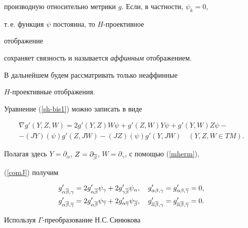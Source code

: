 производную относительно метрики $g$. Если, в частности, $\psi_k=0$,


т.\,е. функция $\psi$ постоянна, то $H$-проективное


отображение


сохраняет связность и называется {\it аффинным} отображением.


В дальнейшем будем рассматривать только неаффинные


$H$-проективные отображения.


Уравнение (\ref{sh-bis1}) можно записать в виде \cite{amka1}


\begin{multline}


\label{hp1}


\nabla g'(Y,Z,W) = 2g'(Y,Z) W\psi + g'(Z,W) Y\psi


+g'(Y,W)Z\psi - \\


- (JY)(\psi) g'(Z,JW) - (JZ)(\psi) g'(Y,JW)\quad


(Y,Z,W \in TM).


\end{multline}


Полагая здесь $Y= \partial_\alpha$, $Z =


\partial_{\ol\beta}$, $W = \partial_\gamma$, с помощью (\ref{mherm}),


(\ref{comJ}) получим


\begin{equation}


\begin{split}


\label{hp2}


g'_{\alpha\ol\beta,\gamma} &= 2 g'_{\alpha\ol\beta}\psi_\gamma


+ 2 g'_{\gamma\ol\beta}\psi_\alpha, \quad


g'_{\alpha\beta,\gamma} = g'_{\alpha\beta,\ol\gamma}=0,\\


g'_{\alpha\ol\beta,\ol\gamma} &= 2 g'_{\alpha\ol\beta}\psi_{\ol\gamma}


+ 2 g'_{\alpha\ol\gamma}\psi_{\ol\beta}, \quad


g'_{\ol\alpha\ol\beta,\gamma} = g'_{\ol\alpha\ol\beta,\ol\gamma}=0.


\end{split}


\end{equation}


Используя $\Gamma$-преобразование Н.С.\,Синюкова \cite{sin1}



